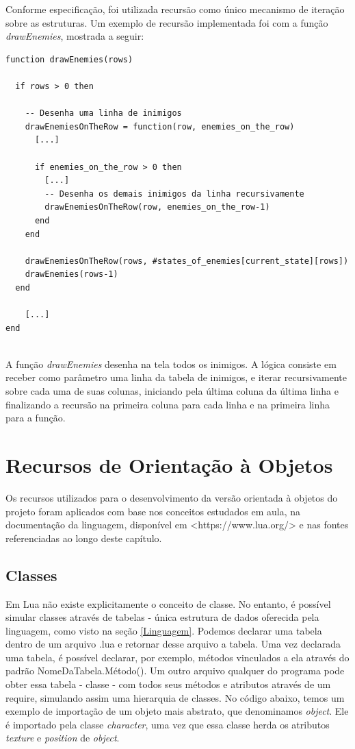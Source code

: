 \documentclass[rel_mlp]{iiufrgs}
\begin{document}
Conforme especificação, foi utilizada recursão como único mecanismo de iteração sobre as estruturas. Um exemplo de recursão implementada foi com a função \textit{drawEnemies}, mostrada a seguir:

\begin{lstlisting}
function drawEnemies(rows)

  if rows > 0 then
  
    -- Desenha uma linha de inimigos
    drawEnemiesOnTheRow = function(row, enemies_on_the_row)      
      [...]

      if enemies_on_the_row > 0 then
        [...]
        -- Desenha os demais inimigos da linha recursivamente
        drawEnemiesOnTheRow(row, enemies_on_the_row-1)
      end
    end
    
    drawEnemiesOnTheRow(rows, #states_of_enemies[current_state][rows])
    drawEnemies(rows-1)
  end
  
  	[...]
end


\end{lstlisting}

A função \textit{drawEnemies} desenha na tela todos os inimigos. A lógica consiste em receber como parâmetro uma linha da tabela de inimigos, e iterar recursivamente sobre cada uma de suas colunas, iniciando pela última coluna da última linha e finalizando a recursão na primeira coluna para cada linha e na primeira linha para a função.


\chapter{Recursos de Orientação à Objetos}

Os recursos utilizados para o desenvolvimento da versão orientada à objetos do projeto foram aplicados com base nos conceitos estudados em aula, na documentação da linguagem, disponível em <https://www.lua.org/> e nas fontes referenciadas ao longo deste capítulo.

\section{Classes} \label{Classes}
	
Em Lua não existe explicitamente o conceito de classe. No entanto, é possível simular classes através de tabelas - única estrutura de dados oferecida pela linguagem, como visto na seção \ref{Linguagem}. Podemos declarar uma tabela dentro de um arquivo .lua e retornar desse arquivo a tabela. Uma vez declarada uma tabela, é possível declarar, por exemplo, métodos vinculados a ela através do padrão NomeDaTabela.Método(). Um outro arquivo qualquer do programa pode obter essa tabela - classe - com todos seus métodos e atributos através de um require, simulando assim uma hierarquia de classes. No código abaixo, temos um exemplo de importação de um objeto mais abstrato, que denominamos \textit{object}. Ele é importado pela classe \textit{character}, uma vez que essa classe herda os atributos \textit{texture} e \textit{position} de \textit{object}.
\end{document}
